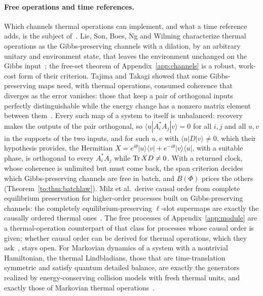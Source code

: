 \paragraph{Free operations and time references.} Which channels thermal operations can implement, and what a time reference adds, is the subject of~\cite{FOR15,Lostaglio15,MarvianSpekkens19,LostaglioMuller19}. Lie, Son, Boes, Ng and Wilming characterize thermal operations as the Gibbs-preserving channels with a dilation, by an arbitrary unitary and environment state, that leaves the environment unchanged on the Gibbs input~\cite[Def.~1, Prop.~4]{LieEtAl26}; the free-set theorem of Appendix~\ref{app:channels} is a robust, work-cost form of their criterion. Tajima and Takagi showed that some Gibbs-preserving maps need, with thermal operations, consumed coherence that diverges as the error vanishes: those that keep a pair of orthogonal inputs perfectly distinguishable while the energy change has a nonzero matrix element between them~\cite[Thm.~1]{TajimaTakagi25}. Every such map of a system to itself is unbalanced: recovery makes the outputs of the pair orthogonal, so $\langle u|A_i^*A_j|v\rangle=0$ for all $i,j$ and all $u,v$ in the supports of the two inputs, and for such $u,v$ with $\langle u|D|v\rangle\neq0$, which their hypothesis provides, the Hermitian $X=e^{i\theta}|u\rangle\langle v|+e^{-i\theta}|v\rangle\langle u|$, with a suitable phase, is orthogonal to every $A_i^*A_j$ while $\operatorname{Tr} XD\neq0$. With a returned clock, whose coherence is unlimited but must come back, the span criterion decides which Gibbs-preserving channels are free in batch, and $B(\Phi)$ prices the others (Theorem~\ref{to:thm:batchlaw}). Milz et al.\ derive causal order from complete equilibrium preservation for higher-order processes built on Gibbs-preserving channels: the completely equilibrium-preserving $\ell$-slot supermaps are exactly the causally ordered thermal ones~\cite[Def.~8, Thm.~6]{Milz26}. The free processes of Appendix~\ref{app:module} are a thermal-operation counterpart of that class for processes whose causal order is given; whether causal order can be derived for thermal operations, which they ask~\cite[Sec.~VI]{Milz26}, stays open. For Markovian dynamics of a system with a nontrivial Hamiltonian, the thermal Lindbladians, those that are time-translation symmetric and satisfy quantum detailed balance, are exactly the generators realized by energy-conserving collision models with fresh thermal units, and exactly those of Markovian thermal operations~\cite[Thm.~1]{LuoTrinity26}.

